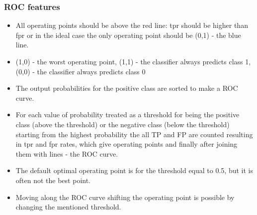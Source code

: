 \documentclass[smaller, proffesionalfonts]{beamer}
\begin{document}
\begin{frame}
\frametitle{ROC features}
\begin{block}{}
\begin{itemize}
\item 
All operating points should be above the red line: tpr should be higher than fpr or in the ideal case the only operating point should be (0,1) - the blue line.
\item 
(1,0) - the worst operating point, (1,1) - the classifier always predicts class 1, (0,0) - the classifier always predicts class 0
\item 
The output probabilities for the positive class are sorted to make a ROC curve.
\item
For each value of probability treated as a threshold for being the positive class (above the threshold) or the negative class (below the threshold) starting from the highest probability the all TP and FP are counted resulting in tpr and fpr rates, which give operating points and finally after joining them with lines - the ROC curve.
\item
The default optimal operating point is for the threshold equal to 0.5, but it is often not the best point.
\item
Moving along the ROC curve shifting the operating point is possible by changing the mentioned threshold.
\end{itemize}
\end{block}
\end{frame}


\end{document}
